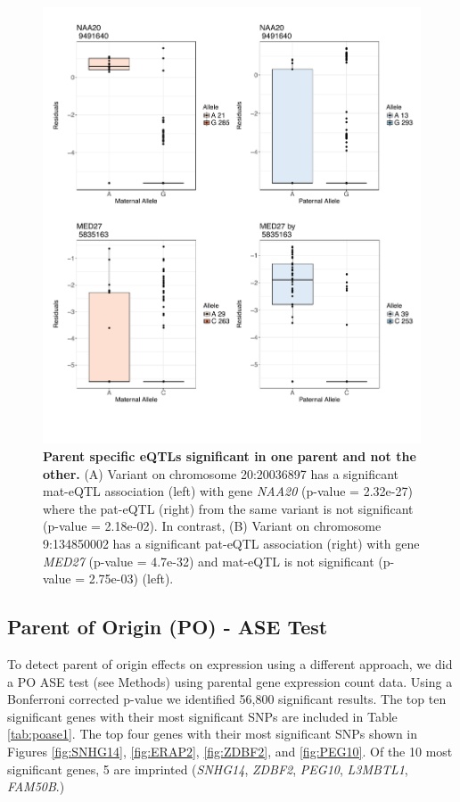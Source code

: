 \begin{figure}[!htb]
\centering \includegraphics[width=5in]{img/ch04/fig-07-sig_notsig.pdf}
\caption[Parent specific eQTLs significant in one parent and not the other]{\textbf{Parent specific eQTLs significant in one parent and not the other.} (A) Variant on chromosome 20:20036897 has a significant mat-eQTL association (left) with gene \emph{NAA20} (p-value = 2.32e-27) where the pat-eQTL (right) from the same variant is not significant (p-value = 2.18e-02). In contrast, (B) Variant on chromosome 9:134850002 has a significant pat-eQTL association (right) with gene \emph{MED27} (p-value = 4.7e-32) and mat-eQTL is not significant (p-value = 2.75e-03) (left).}
\label{fig:sig_notsig}
\end{figure}


\subsection{Parent of Origin (PO) - ASE Test}\label{Parent of Origin (PO) - ASE Test} 

To detect parent of origin effects on expression using a different approach, we did a PO ASE test (see Methods) using parental gene expression count data. Using a Bonferroni corrected p-value we identified 56,800 significant results. The top ten significant genes with their most significant SNPs are included in Table \ref{tab:poase1}. The top four genes with their most significant SNPs shown in Figures \ref{fig:SNHG14}, \ref{fig:ERAP2}, \ref{fig:ZDBF2}, and \ref{fig:PEG10}. Of the 10 most significant genes, 5 are imprinted (\emph{SNHG14}, \emph{ZDBF2}, \emph{PEG10}, \emph{L3MBTL1}, \emph{FAM50B}.)

